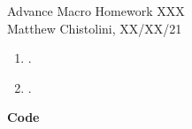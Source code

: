 \documentclass[12pt,oneside,reqno]{amsart}
\begin{document}
\begin{center}
    \Huge{Advance Macro Homework XXX}\\
    \large{Matthew Chistolini, XX/XX/21}
\end{center}
\vspace{-.3cm}
\begin{enumerate}
\item . \\
    
\item .\\
    
\end{enumerate}
{\bf Code}

% 
\end{document}
